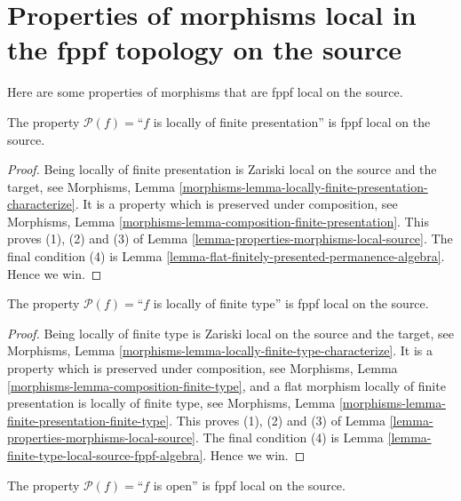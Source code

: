 \section{Properties of morphisms local in the fppf topology on the source}
\label{section-fppf-local-source}

\noindent
Here are some properties of morphisms that are fppf local on the source.

\begin{lemma}
\label{lemma-locally-finite-presentation-fppf-local-source}
The property $\mathcal{P}(f)=$``$f$ is locally of finite presentation''
is fppf local on the source.
\end{lemma}

\begin{proof}
Being locally of finite presentation is Zariski local on the source
and the target, see Morphisms,
Lemma \ref{morphisms-lemma-locally-finite-presentation-characterize}.
It is a property which is preserved under composition, see
Morphisms, Lemma \ref{morphisms-lemma-composition-finite-presentation}.
This proves
(1), (2) and (3) of Lemma \ref{lemma-properties-morphisms-local-source}.
The final condition (4) is
Lemma \ref{lemma-flat-finitely-presented-permanence-algebra}. Hence we win.
\end{proof}

\begin{lemma}
\label{lemma-locally-finite-type-fppf-local-source}
The property $\mathcal{P}(f)=$``$f$ is locally of finite type''
is fppf local on the source.
\end{lemma}

\begin{proof}
Being locally of finite type is Zariski local on the source
and the target, see Morphisms,
Lemma \ref{morphisms-lemma-locally-finite-type-characterize}.
It is a property which is preserved under composition, see
Morphisms, Lemma \ref{morphisms-lemma-composition-finite-type}, and
a flat morphism locally of finite presentation is locally of finite type, see
Morphisms, Lemma \ref{morphisms-lemma-finite-presentation-finite-type}.
This proves
(1), (2) and (3) of Lemma \ref{lemma-properties-morphisms-local-source}.
The final condition (4) is
Lemma \ref{lemma-finite-type-local-source-fppf-algebra}. Hence we win.
\end{proof}

\begin{lemma}
\label{lemma-open-fppf-local-source}
The property $\mathcal{P}(f)=$``$f$ is open''
is fppf local on the source.
\end{lemma}


